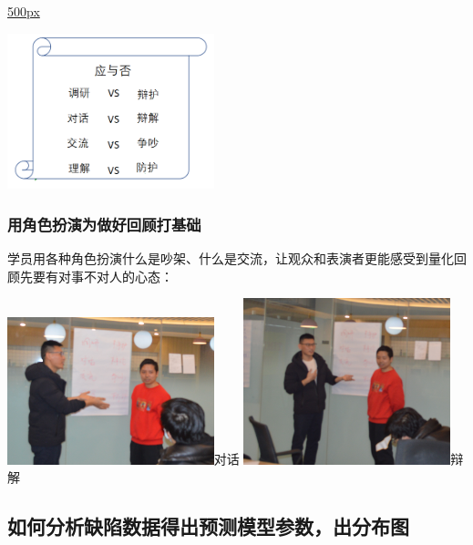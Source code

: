 \href{文件:_游戏1应与否1.png}{500px}

\includegraphics[width=6cm]{游戏1应与否1.png}

\hypertarget{ux7528ux89d2ux8272ux626eux6f14ux4e3aux505aux597dux56deux987eux6253ux57faux7840}{%
\subsubsection{用角色扮演为做好回顾打基础}\label{ux7528ux89d2ux8272ux626eux6f14ux4e3aux505aux597dux56deux987eux6253ux57faux7840}}

学员用各种角色扮演什么是吵架、什么是交流，让观众和表演者更能感受到量化回顾先要有对事不对人的心态：



\includegraphics[width=6cm]{1498.png}\textbar{}对话 \includegraphics[width=6cm]{1499.png}\textbar{}辩解

\hypertarget{ux5982ux4f55ux5728ux8fedux4ee3ux56deux987eux65f6ux5206ux6790ux7f3aux9677ux6570ux636eux5f97ux51faux9884ux6d4bux6a21ux578bux53c2ux6570}{%
\subsection{如何分析缺陷数据得出预测模型参数，出分布图}\label{ux5982ux4f55ux5728ux8fedux4ee3ux56deux987eux65f6ux5206ux6790ux7f3aux9677ux6570ux636eux5f97ux51faux9884ux6d4bux6a21ux578bux53c2ux6570}}

